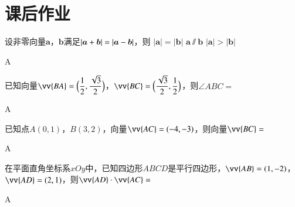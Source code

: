 \section{课后作业}
  \begin{exercise}
    \item %
      设非零向量$\bm a$，$\bm b$满足$\left| \bm a+\bm b \right|=\left| \bm a-\bm b \right|$，则\xz
       {$|\bm a|=|\bm b|$}
       {$\bm a\varparallel \bm b$}
       {$|\bm a|>|\bm b|$}
      \begin{answer}
        A
      \end{answer}
    \item %
      已知向量$\vv{BA}=\Bp{\dfrac12,\dfrac{\sqrt3}2}$，$\vv{BC}=\Bp{\dfrac{\sqrt3}2,\dfrac12}$，则$\angle{ABC}=$\xz
      \xx{30\degree}{45\degree}{60\degree}{120\degree}
      \begin{answer}
        A
      \end{answer}
    \item %
      已知点$A(0,1)$，$B(3,2)$，向量$\vv{AC}=(-4,-3)$，则向量$\vv{BC}=$\xz
      \begin{answer}
        A
      \end{answer}
    \item %
      在平面直角坐标系$xOy$中，已知四边形$ABCD$是平行四边形，$\vv{AB}=(1,-2)$，$\vv{AD}=(2,1)$，则$\vv{AD}\cdot\vv{AC}=$\xz
      \begin{answer}
        A
      \end{answer}
    \item %

\end{exercise}
